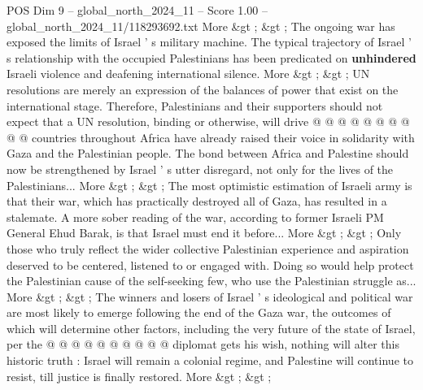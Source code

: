 \begin{textsample}{POS Dim 9 – global\_north\_2024\_11 – Score 1.00 – global\_north\_2024\_11/118293692.txt}
More \&gt ; \&gt ; The ongoing war has exposed the limits of Israel ' s military machine.
The typical trajectory of Israel ' s relationship with the occupied Palestinians has been predicated on \textbf{unhindered} Israeli violence and deafening international silence.
More \&gt ; \&gt ; UN resolutions are merely an expression of the balances of power that exist on the international stage.
Therefore, Palestinians and their supporters should not expect that a UN resolution, binding or otherwise, will drive @ @ @ @ @ @ @ @ @ @ countries throughout Africa have already raised their voice in solidarity with Gaza and the Palestinian people.
The bond between Africa and Palestine should now be strengthened by Israel ' s utter disregard, not only for the lives of the Palestinians...
More \&gt ; \&gt ; The most optimistic estimation of Israeli army is that their war, which has practically destroyed all of Gaza, has resulted in a stalemate.
A more sober reading of the war, according to former Israeli PM General Ehud Barak, is that Israel must end it before...
More \&gt ; \&gt ; Only those who truly reflect the wider collective Palestinian experience and aspiration deserved to be centered, listened to or engaged with.
Doing so would help protect the Palestinian cause of the self-seeking few, who use the Palestinian struggle as...
More \&gt ; \&gt ; The winners and losers of Israel ' s ideological and political war are most likely to emerge following the end of the Gaza war, the outcomes of which will determine other factors, including the very future of the state of Israel, per the @ @ @ @ @ @ @ @ @ @ diplomat gets his wish, nothing will alter this historic truth : Israel will remain a colonial regime, and Palestine will continue to resist, till justice is finally restored.
More \&gt ; \&gt ;

\end{textsample}
